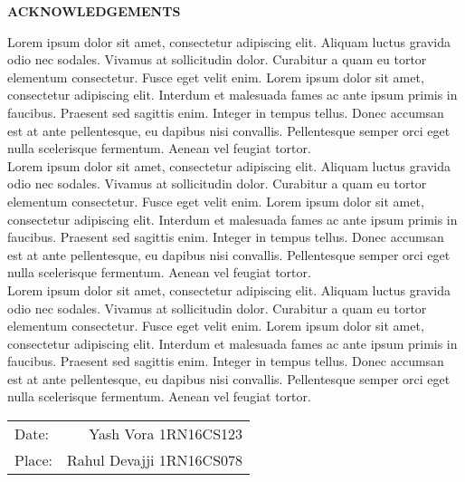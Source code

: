 \thispagestyle{empty}
\begin{center}
\textup{\large{\textbf{ACKNOWLEDGEMENTS}}} \\[0.1in]
\end{center}

\justify
\indent
Lorem ipsum dolor sit amet, consectetur adipiscing elit. Aliquam luctus gravida odio nec sodales. Vivamus at sollicitudin dolor. Curabitur a quam eu tortor elementum consectetur. Fusce eget velit enim. Lorem ipsum dolor sit amet, consectetur adipiscing elit. Interdum et malesuada fames ac ante ipsum primis in faucibus. Praesent sed sagittis enim. Integer in tempus tellus. Donec accumsan est at ante pellentesque, eu dapibus nisi convallis. Pellentesque semper orci eget nulla scelerisque fermentum. Aenean vel feugiat tortor.\\
\indent
Lorem ipsum dolor sit amet, consectetur adipiscing elit. Aliquam luctus gravida odio nec sodales. Vivamus at sollicitudin dolor. Curabitur a quam eu tortor elementum consectetur. Fusce eget velit enim. Lorem ipsum dolor sit amet, consectetur adipiscing elit. Interdum et malesuada fames ac ante ipsum primis in faucibus. Praesent sed sagittis enim. Integer in tempus tellus. Donec accumsan est at ante pellentesque, eu dapibus nisi convallis. Pellentesque semper orci eget nulla scelerisque fermentum. Aenean vel feugiat tortor.\\
\indent
Lorem ipsum dolor sit amet, consectetur adipiscing elit. Aliquam luctus gravida odio nec sodales. Vivamus at sollicitudin dolor. Curabitur a quam eu tortor elementum consectetur. Fusce eget velit enim. Lorem ipsum dolor sit amet, consectetur adipiscing elit. Interdum et malesuada fames ac ante ipsum primis in faucibus. Praesent sed sagittis enim. Integer in tempus tellus. Donec accumsan est at ante pellentesque, eu dapibus nisi convallis. Pellentesque semper orci eget nulla scelerisque fermentum. Aenean vel feugiat tortor.\\[4in]


\justify
\begin{tabular}{l r}
\textup{Date:} & \hspace{9cm}\textup{Yash Vora 1RN16CS123}\\
\textup{Place:} & \hspace{9cm}\textup{Rahul Devajji 1RN16CS078}
\end{tabular}


\pagebreak